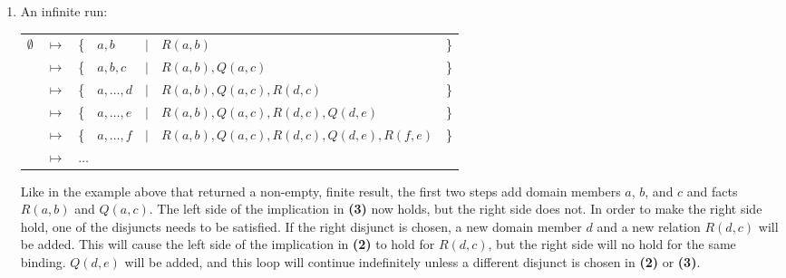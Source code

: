 \begin{enumerate}
		\item An infinite run:

			\begin{tabular}{lllllll}
				$\emptyset$ & $\mapsto$ & \{ & $a,b$        & $|$ & $R(a,b)$                                 & \} \\
				{}          & $\mapsto$ & \{ & $a,b,c$      & $|$ & $R(a,b), Q(a,c)$                         & \} \\
				{}          & $\mapsto$ & \{ & $a,\ldots,d$ & $|$ & $R(a,b), Q(a,c), R(d,c)$                 & \} \\
				{}          & $\mapsto$ & \{ & $a,\ldots,e$ & $|$ & $R(a,b), Q(a,c), R(d,c), Q(d,e)$         & \} \\
				{}          & $\mapsto$ & \{ & $a,\ldots,f$ & $|$ & $R(a,b), Q(a,c), R(d,c), Q(d,e), R(f,e)$ & \} \\
				{}          & $\mapsto$ & \multicolumn{5}{l}{ $\ldots$ }                                          \\
			\end{tabular}

			Like in the example above that returned a non-empty, finite result,
			the first two steps add domain members $a$, $b$, and $c$ and facts
			$R(a,b)$ and $Q(a,c)$. The left side of the implication in
			\textbf{(3)} now holds, but the right side does not. In order to
			make the right side hold, one of the disjuncts needs to be
			satisfied. If the right disjunct is chosen, a new domain member $d$
			and a new relation $R(d,c)$ will be added.  This will cause the
			left side of the implication in \textbf{(2)} to hold for $R(d,c)$,
			but the right side will no hold for the same binding. $Q(d,e)$ will
			be added, and this loop will continue indefinitely unless a
			different disjunct is chosen in \textbf{(2)} or \textbf{(3)}.

		\end{enumerate}
